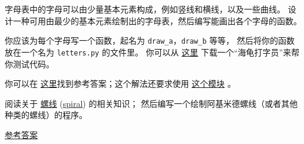 \begin{exercise}
    


字母表中的字母可以由少量基本元素构成，例如竖线和横线，以及一些曲线。
设计一种可用由最少的基本元素绘制出的字母表，然后编写能画出各个字母的函数。


你应该为每个字母写一个函数，起名为 \lstinline{draw_a}，\lstinline{draw_b} 等等，
然后将你的函数放在一个名为 \lstinline{letters.py} 的文件里。
你可以从 \href{http://thinkpython2.com/code/typewriter.py}{这里}
下载一个``海龟打字员''来帮你测试代码。


你可以在 \href{http://thinkpython2.com/code/letters.py}{这里}找到参考答案；这个解法还要求使用 \href{http://thinkpython2.com/code/polygon.py}{这个模块} 。

\end{exercise}

\begin{exercise}


阅读关于 \href{https://zh.wikipedia.org/wiki/%E8%9E%BA%E7%BA%BF}{螺线} (\href{http://en.wikipedia.org/wiki/Spiral}{spiral}) 的相关知识；
然后编写一个绘制阿基米德螺线（或者其他种类的螺线）的程序。
  

\href{http://thinkpython2.com/code/spiral.py}{参考答案}

\end{exercise}

